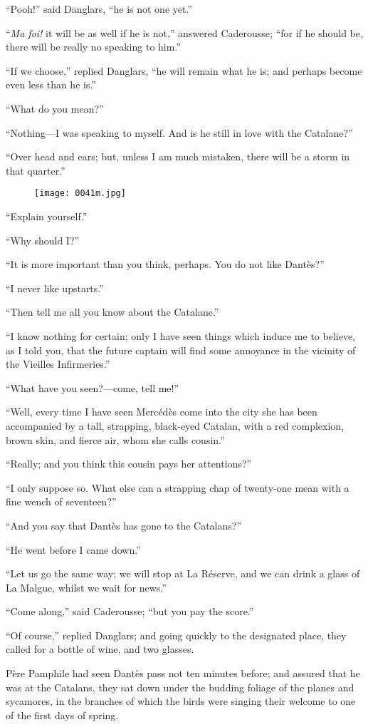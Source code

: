 “Pooh!” said Danglars, “he is not one yet.”

“\textit{Ma foi!} it will be as well if he is not,” answered Caderousse; “for
if he should be, there will be really no speaking to him.”

“If we choose,” replied Danglars, “he will remain what he is; and
perhaps become even less than he is.”

“What do you mean?”

“Nothing—I was speaking to myself. And is he still in love with the
Catalane?”

“Over head and ears; but, unless I am much mistaken, there will be a
storm in that quarter.”

\begin{figure}[h]
\texttt{[image: 0041m.jpg]}
\end{figure}

“Explain yourself.”

“Why should I?”

“It is more important than you think, perhaps. You do not like Dantès?”

“I never like upstarts.”

“Then tell me all you know about the Catalane.”

“I know nothing for certain; only I have seen things which induce me to
believe, as I told you, that the future captain will find some
annoyance in the vicinity of the Vieilles Infirmeries.”

“What have you seen?—come, tell me!”

“Well, every time I have seen Mercédès come into the city she has been
accompanied by a tall, strapping, black-eyed Catalan, with a red
complexion, brown skin, and fierce air, whom she calls cousin.”

“Really; and you think this cousin pays her attentions?”

“I only suppose so. What else can a strapping chap of twenty-one mean
with a fine wench of seventeen?”

“And you say that Dantès has gone to the Catalans?”

“He went before I came down.”

“Let us go the same way; we will stop at La Réserve, and we can drink a
glass of La Malgue, whilst we wait for news.”

“Come along,” said Caderousse; “but you pay the score.”

“Of course,” replied Danglars; and going quickly to the designated
place, they called for a bottle of wine, and two glasses.

Père Pamphile had seen Dantès pass not ten minutes before; and assured
that he was at the Catalans, they sat down under the budding foliage of
the planes and sycamores, in the branches of which the birds were
singing their welcome to one of the first days of spring.
